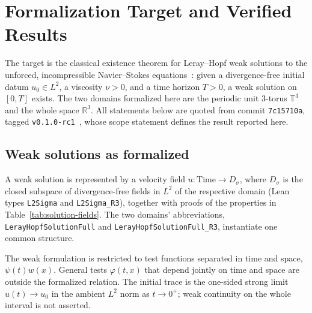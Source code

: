 \section{Formalization Target and Verified Results}\label{sec:formalization}

The target is the classical existence theorem for
Leray--Hopf weak solutions to the unforced, incompressible
Navier--Stokes equations~\cite{leray1934,hopf1951}: given a
divergence-free initial datum $u_0 \in L^2$, a viscosity $\nu > 0$, and a
time horizon $T > 0$, a weak solution on $[0,T]$ exists. The two domains
formalized here are the periodic unit 3-torus $\mathbb{T}^3$ and the whole
space $\mathbb{R}^3$. All statements below are
quoted from commit \texttt{7c15710a}, tagged
\texttt{v0.1.0-rc1}~\cite{lerayhopf2026repo}, whose scope statement defines
the result reported here. %

\subsection{Weak solutions as formalized}

A weak solution is represented by a velocity field
$u : \mathrm{Time} \to D_\sigma$, where $D_\sigma$ is the closed subspace of
divergence-free fields in $L^2$ of the respective domain (Lean types
\texttt{L2Sigma} and \texttt{L2Sigma\_R3}), together with proofs of the
properties in Table~\ref{tab:solution-fields}. The two domains'
abbreviations, \texttt{LerayHopfSolutionFull} and
\texttt{LerayHopfSolutionFull\_R3}, instantiate one common structure.

The weak formulation is restricted to test functions separated in time
and space, $\psi(t)w(x)$. General tests $\varphi(t,x)$ that depend jointly
on time and space are outside the formalized relation. The initial trace is the one-sided strong limit
$u(t)\to u_0$ in the ambient $L^2$ norm as $t\to0^+$; weak continuity on
the whole interval is not asserted.

